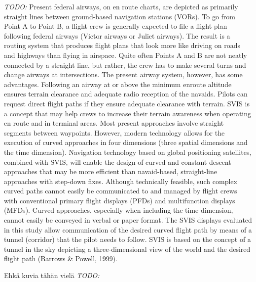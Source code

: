 \documentclass[utf8,bachelor,manualbib]{gradu3}
\begin{document}
\emph{TODO:}
Present federal airways, on en route charts, are depicted as primarily straight
lines between ground-based navigation stations (VORs). To go from Point A to
Point B, a flight crew is generally expected to file a flight plan following federal
airways (Victor airways or Juliet airways). The result is a routing system that produces
flight plans that look more like driving on roads and highways than flying in
airspace. Quite often Points A and B are not neatly connected by a straight line, but
rather, the crew has to make several turns and change airways at intersections. The
present airway system, however, has some advantages. Following an airway at or
above the minimum enroute altitude ensures terrain clearance and adequate radio
reception of the navaids. Pilots can request direct flight paths if they ensure adequate
clearance with terrain. SVIS is a concept that may help crews to increase
their terrain awareness when operating en route and in terminal areas.
Most present approaches involve straight segments between waypoints. However,
modern technology allows for the execution of curved approaches in four dimensions
(three spatial dimensions and the time dimension). Navigation technology
based on global positioning satellites, combined with SVIS, will enable the
design of curved and constant descent approaches that may be more efficient than
navaid-based, straight-line approaches with step-down fixes. Although technically
feasible, such complex curved paths cannot easily be communicated to and
managed by flight crews with conventional primary flight displays (PFDs) and
multifunction displays (MFDs). Curved approaches, especially when including
the time dimension, cannot easily be conveyed in verbal or paper format.
The SVIS displays evaluated in this study allow communication of the desired
curved flight path by means of a tunnel (corridor) that the pilot needs to follow.
SVIS is based on the concept of a tunnel in the sky depicting a three-dimensional
view of the world and the desired flight path (Barrows \& Powell, 1999). \citep{schnellym2004}

Ehkä kuvia tähän vielä \citep{schnellym2004} \emph{TODO:}
\end{document}

